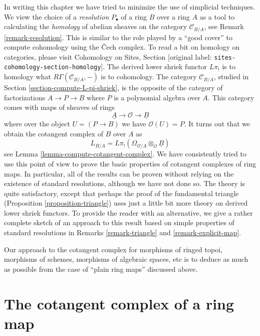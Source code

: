 \documentclass[10pt,a4paper]{article}
\theoremstyle{plain}
\theoremstyle{definition}
\theoremstyle{remark}
\numberwithin{equation}{subsection}
\begin{document}
\noindent
In writing this chapter we have tried to minimize
the use of simplicial techniques. We view the choice of a {\it resolution}
$P_\bullet$ of a ring $B$ over a ring $A$ as a tool to calculating the
{\it homology} of abelian sheaves on the category $\mathcal{C}_{B/A}$, see
Remark \ref{remark-resolution}. This is similar to the role played
by a ``good cover'' to compute cohomology using the {\v C}ech complex.
To read a bit on homology on categories, please visit
Cohomology on Sites, Section \textnormal{[original label: \nolinkurl{sites-cohomology-section-homology}]}.
The derived lower shriek functor $L\pi_!$ is to homology what
$R\Gamma(\mathcal{C}_{B/A}, -)$ is to cohomology. The category
$\mathcal{C}_{B/A}$, studied in Section \ref{section-compute-L-pi-shriek},
is the opposite of the category of factorizations $A \to P \to B$ where $P$
is a polynomial algebra over $A$. This category comes with maps of sheaves
of rings
$$
\underline{A} \longrightarrow \mathcal{O} \longrightarrow \underline{B}
$$
where over the object $U =  (P \to B)$ we have $\mathcal{O}(U) = P$. 
It turns out that we obtain the cotangent complex of $B$ over $A$ as
$$
L_{B/A} =
L\pi_!(\Omega_{\mathcal{O}/\underline{A}} \otimes_\mathcal{O} \underline{B})
$$
see Lemma \ref{lemma-compute-cotangent-complex}. We have consistently tried
to use this point of view to prove the basic properties of cotangent
complexes of ring maps. In particular, all of the results can be proven
without relying on the existence of standard resolutions, although we have
not done so. The theory is quite satisfactory, except that
perhaps the proof of the fundamental triangle
(Proposition \ref{proposition-triangle}) uses just a little
bit more theory on derived lower shriek functors.
To provide the reader with an alternative,
we give a rather complete sketch of an approach to this result
based on simple properties of standard resolutions in
Remarks \ref{remark-triangle} and \ref{remark-explicit-map}.

\medskip\noindent
Our approach to the cotangent complex for morphisms of ringed topoi,
morphisms of schemes, morphisms of algebraic spaces, etc
is to deduce as much as possible from the case of ``plain ring maps''
discussed above.





\section{The cotangent complex of a ring map}
\label{section-cotangent-ring-map}
\end{document}
